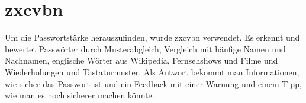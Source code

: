 \section{zxcvbn}
Um die Passwortstärke herauszufinden, wurde zxcvbn verwendet. Es erkennt und bewertet Passwörter durch Musterabgleich, Vergleich mit häufige Namen und Nachnamen, englische Wörter aus Wikipedia, Fernsehshows und Filme und Wiederholungen und Tastaturmuster. Als Antwort bekommt man Informationen, wie sicher das Passwort ist und ein Feedback mit einer Warnung und einem Tipp, wie man es noch sicherer machen könnte. \autocite{zxcvbn}